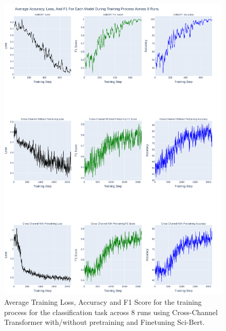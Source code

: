 \begin{figure}[p]
    \centering
    \includegraphics[width=\maxwidth{\textwidth}]{src/images/Loss-Distriubiton-Train-Set-2.pdf}
    \caption{Average Training Loss, Accuracy and F1 Score for the training process for the classification task across 8 runs using Cross-Channel Transformer with/without pretraining and Finetuning Sci-Bert.}
    \label{figure\arabic{figurecounter}}
\end{figure}

